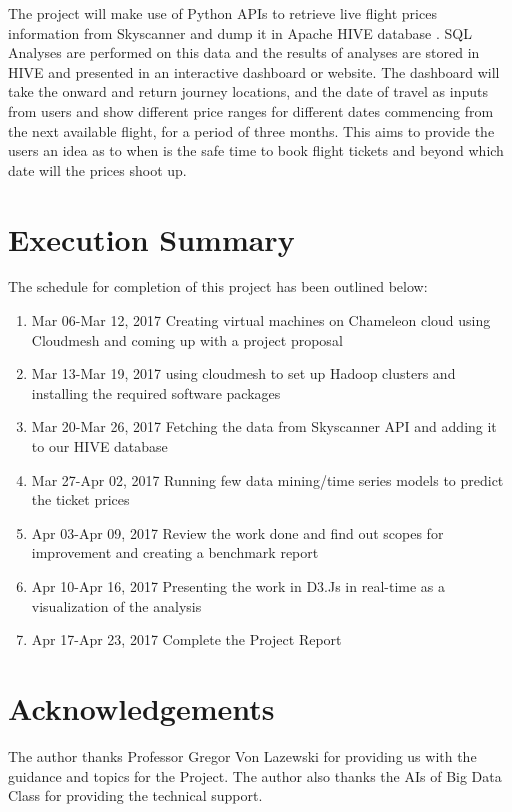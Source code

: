 \documentclass[9pt,twocolumn,twoside]{styles/osajnl}
\begin{document}
The project will make use of Python APIs to retrieve live flight prices information from Skyscanner and dump it in Apache HIVE database \cite{www-hive}. SQL Analyses are performed on this data and the results of analyses are stored in HIVE and presented in an interactive dashboard or website. The dashboard will take the onward and return journey locations, and the date of travel as inputs from users and show different price ranges for different dates commencing from the next available flight, for a period of three months. This aims to provide the users an idea as to when is the safe time to book flight tickets and beyond which date will the prices shoot up. 

\section{Execution Summary}
The schedule for completion of this project has been outlined below:
\begin{enumerate}
\item {Mar 06-Mar 12, 2017} Creating virtual machines on Chameleon cloud using Cloudmesh and coming up with a project proposal
\item {Mar 13-Mar 19, 2017} using cloudmesh to set up Hadoop clusters and installing the required software packages
\item {Mar 20-Mar 26, 2017} Fetching the data from Skyscanner API and adding it to our HIVE database
\item {Mar 27-Apr 02, 2017} Running few data mining/time series models to predict the ticket prices
\item {Apr 03-Apr 09, 2017} Review the work done and find out scopes for improvement and creating a benchmark report
\item {Apr 10-Apr 16, 2017} Presenting the work in D3.Js in real-time as a visualization of the analysis 
\item {Apr 17-Apr 23, 2017} Complete the Project Report
\end{enumerate}

\section*{Acknowledgements}

The author thanks Professor Gregor Von Lazewski for providing us with the guidance and topics for the Project. The author also thanks the AIs of Big Data Class for providing the technical
support.


\end{document}
